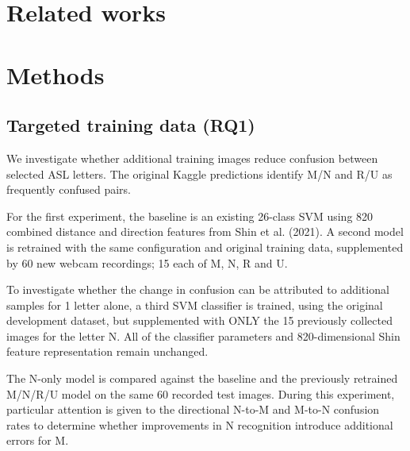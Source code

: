 \documentclass{article}
\begin{document}
\section{Related works}

\section{Methods}

\subsection{Targeted training data (RQ1)}
We investigate whether additional training images reduce confusion between selected ASL letters. The original Kaggle predictions identify M/N and R/U as frequently confused pairs.

For the first experiment, the baseline is an existing 26-class SVM using 820 combined distance and direction features from Shin et al. (2021). A second model is retrained with the same configuration and original training data, supplemented by 60 new webcam recordings; 15 each of M, N, R and U.

To investigate whether the change in confusion can be attributed to additional samples for 1 letter alone, a third SVM classifier is trained, using the original development dataset, but supplemented with ONLY the 15 previously collected images for the letter N. All of the classifier parameters and 820-dimensional Shin feature representation remain unchanged. 

The N-only model is compared against the baseline and the previously retrained M/N/R/U model on the same 60 recorded test images. During this experiment, particular attention is given to the directional N-to-M and M-to-N confusion rates to determine whether improvements in N recognition introduce additional errors for M.
\end{document}

